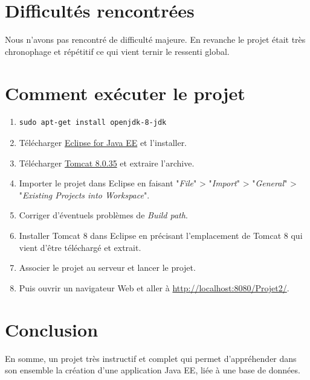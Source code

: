 \section{Difficultés rencontrées}

Nous n'avons pas rencontré de difficulté majeure. En revanche le projet était très chronophage et répétitif ce qui vient ternir le ressenti global.

\section{Comment exécuter le projet}

\fakeshell

\begin{enumerate}
    \item
        \begin{lstlisting}
sudo apt-get install openjdk-8-jdk
        \end{lstlisting}
    \item Télécharger \href{http://www.eclipse.org/downloads/packages/eclipse-ide-java-ee-developers/mars2}{Eclipse for Java EE} et l'installer.
    \item Télécharger \href{http://tomcat.apache.org/download-80.cgi\#8.0.35}{Tomcat 8.0.35} et extraire l'archive.
    \item Importer le projet dans Eclipse en faisant "\textit{File}" > "\textit{Import}" > "\textit{General}" > "\textit{Existing Projects into Workspace}".
    \item Corriger d'éventuels problèmes de \textit{Build path}.
    \item Installer Tomcat 8 dans Eclipse en précisant l'emplacement de Tomcat 8 qui vient d'être téléchargé et extrait.
    \item Associer le projet au serveur et lancer le projet.
    \item Puis ouvrir un navigateur Web et aller à \url{http://localhost:8080/Projet2/}.
\end{enumerate}

\section{Conclusion}

En somme, un projet très instructif et complet qui permet d'appréhender dans son ensemble la création d'une application Java EE, liée à une base de données.
